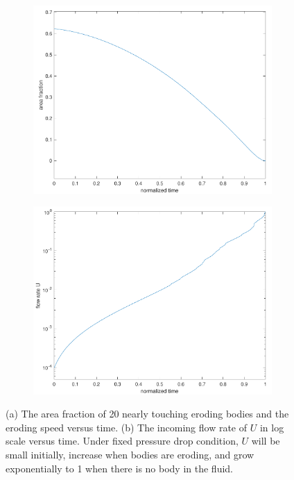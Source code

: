 \documentclass[preprint, 10pt]{elsarticle}
\begin{document}
\begin{figure}[H]
\begin{subfigure}[b]{0.5\textwidth}
\includegraphics*[width =\linewidth]{./figs/porosity20dense}
\caption{}
\end{subfigure}%
\begin{subfigure}[b]{0.5\textwidth}
\includegraphics*[width =\linewidth]{./figs/flow_rate20dense}
\caption{}
\end{subfigure}
\caption{\label{fig:Eroding20area}  (a) The area fraction of 20 nearly
  touching eroding bodies and the eroding speed versus time. 
(b) The incoming flow rate of $U$ in log scale versus time. 
Under fixed pressure drop condition, $U$ will be small initially,
increase when bodies are eroding, and grow exponentially 
to 1 when there is no body in the fluid. }
\end{figure}
\end{document}
